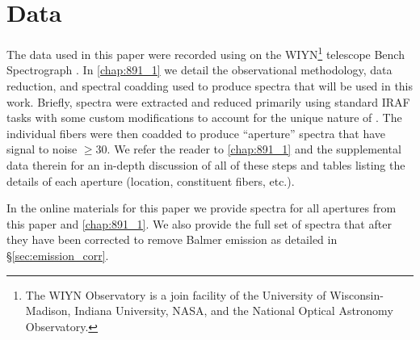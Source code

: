 \section{Data}
\label{891_2:sec:data}
The data used in this paper were recorded using \GP \citep{Wood12} on
the WIYN\footnote{The WIYN Observatory is a join facility of the
  University of Wisconsin-Madison, Indiana University, NASA, and the
  National Optical Astronomy Observatory.} telescope Bench
Spectrograph \citep{Barden94,Bershady08,Knezek10}. In
\ref{chap:891_1} we detail the observational methodology,
data reduction, and spectral coadding used to produce spectra that
will be used in this work. Briefly, spectra were extracted and reduced
primarily using standard IRAF tasks with some custom modifications to
account for the unique nature of \GP. The individual fibers were then
coadded to produce ``aperture'' spectra that have signal to noise
$\geq 30$. We refer the reader to \ref{chap:891_1} and the
supplemental data therein for an in-depth discussion of all of these
steps and tables listing the details of each aperture (location,
constituent fibers, etc.).

In the online materials for this paper we provide spectra for all
apertures from this paper and \ref{chap:891_1}. We also
provide the full set of spectra that after they have been corrected to
remove Balmer emission as detailed in \S\ref{sec:emission_corr}.
